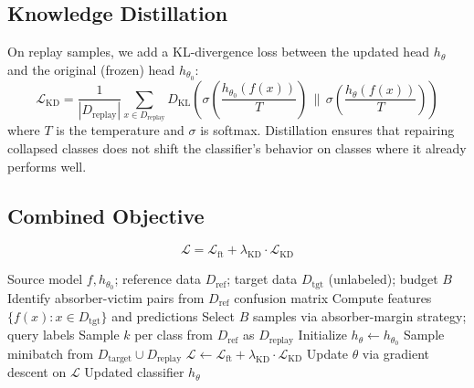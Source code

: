 \documentclass[journal]{IEEEtran}
\newcommand{\ours}{CARE}  %
\begin{document}
\subsection{Knowledge Distillation}

On replay samples, we add a KL-divergence loss between the updated head $h_\theta$ and the original (frozen) head $h_{\theta_0}$:
\begin{equation}
  \mathcal{L}_{\text{KD}} = \frac{1}{|D_{\text{replay}}|} \sum_{x \in D_{\text{replay}}} D_{\text{KL}}\!\left(\sigma\!\left(\frac{h_{\theta_0}(f(x))}{T}\right) \,\Big\|\, \sigma\!\left(\frac{h_\theta(f(x))}{T}\right)\right)
\end{equation}
where $T$ is the temperature and $\sigma$ is softmax.
Distillation ensures that repairing collapsed classes does not shift the classifier's behavior on classes where it already performs well.

\subsection{Combined Objective}

\begin{equation}
  \mathcal{L} = \mathcal{L}_{\text{ft}} + \lambda_{\text{KD}} \cdot \mathcal{L}_{\text{KD}}
\end{equation}

\begin{algorithm}[t]
\caption{\ours{}: Collapse-Aware Active Repair}
\label{alg:care}
\begin{algorithmic}[1]
\REQUIRE Source model $f, h_{\theta_0}$; reference data $D_{\text{ref}}$; target data $D_{\text{tgt}}$ (unlabeled); budget $B$
\STATE Identify absorber-victim pairs from $D_{\text{ref}}$ confusion matrix
\STATE Compute features $\{f(x) : x \in D_{\text{tgt}}\}$ and predictions
\STATE Select $B$ samples via absorber-margin strategy; query labels
\STATE Sample $k$ per class from $D_{\text{ref}}$ as $D_{\text{replay}}$
\STATE Initialize $h_\theta \leftarrow h_{\theta_0}$
  \STATE Sample minibatch from $D_{\text{target}} \cup D_{\text{replay}}$
  \STATE $\mathcal{L} \leftarrow \mathcal{L}_{\text{ft}} + \lambda_{\text{KD}} \cdot \mathcal{L}_{\text{KD}}$
  \STATE Update $\theta$ via gradient descent on $\mathcal{L}$
\ENDFOR
\RETURN Updated classifier $h_\theta$
\end{algorithmic}
\end{algorithm}


\end{document}
